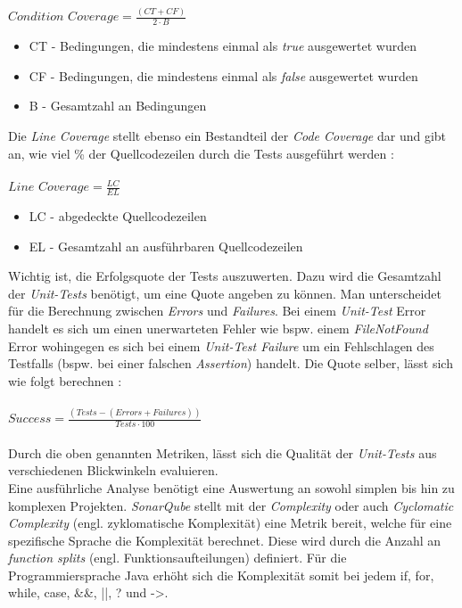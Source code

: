 $Condition \,\, Coverage = \frac{(CT + CF)}{2 \cdot B}$
\begin{itemize}
    \setlength{\parskip}{1pt}
    \item CT - Bedingungen, die mindestens einmal als \textit{true} ausgewertet wurden
    \item CF - Bedingungen, die mindestens einmal als \textit{false} ausgewertet wurden
    \item B - Gesamtzahl an Bedingungen
\end{itemize}
Die \textit{Line Coverage} stellt ebenso ein Bestandteil der \textit{Code Coverage} dar und gibt an, wie viel \% der Quellcodezeilen durch die Tests ausgeführt werden \cite*{MetricDefinition}:\\\\
$Line \,\, Coverage = \frac{LC}{EL}$
\begin{itemize}
    \setlength{\parskip}{1pt}
    \item LC - abgedeckte Quellcodezeilen
    \item EL - Gesamtzahl an ausführbaren Quellcodezeilen
\end{itemize}
Wichtig ist, die Erfolgsquote der Tests auszuwerten. Dazu wird die Gesamtzahl der \textit{Unit-Tests} benötigt, um eine Quote angeben zu können. Man unterscheidet für die Berechnung zwischen \textit{Errors} und \textit{Failures}. Bei einem \textit{Unit-Test} Error handelt es sich um einen unerwarteten Fehler wie bspw. einem \textit{FileNotFound} Error wohingegen es sich bei einem \textit{Unit-Test Failure} um ein Fehlschlagen des Testfalls (bspw. bei einer falschen \textit{Assertion}) handelt. Die Quote selber, lässt sich wie folgt berechnen \cite*{MetricDefinition}:\\\\
$Success = \frac{(Tests - (Errors + Failures))}{Tests \cdot 100}$\\\\
Durch die oben genannten Metriken, lässt sich die Qualität der \textit{Unit-Tests} aus verschiedenen Blickwinkeln evaluieren.\\
Eine ausführliche Analyse benötigt eine Auswertung an sowohl simplen bis hin zu komplexen Projekten. \textit{SonarQube} stellt mit der \textit{Complexity} oder auch \textit{Cyclomatic Complexity} (engl. zyklomatische Komplexität) eine Metrik bereit, welche für eine spezifische Sprache die Komplexität berechnet. Diese wird durch die Anzahl an \textit{function splits} (engl. Funktionsaufteilungen) definiert. Für die Programmiersprache Java erhöht sich die Komplexität somit bei jedem \colorbox{gray!20}{if}, \colorbox{gray!20}{for}, \colorbox{gray!20}{while}, \colorbox{gray!20}{case}, \colorbox{gray!20}{\&\&}, \colorbox{gray!20}{||}, \colorbox{gray!20}{?} und \colorbox{gray!20}{->}. \cite*{MetricDefinition}
